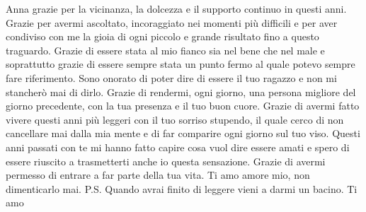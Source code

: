 \documentclass[12pt,a4paper,twoside]{report}
\begin{document}
Anna grazie per la vicinanza, la dolcezza e il supporto continuo in questi anni. 
\newline Grazie per avermi ascoltato, incoraggiato nei momenti più difficili e per aver condiviso con me la gioia di ogni piccolo e grande risultato fino a questo traguardo.
\newline Grazie di essere stata al mio fianco sia nel bene che nel male e soprattutto grazie di essere sempre stata un punto fermo al quale potevo sempre fare riferimento.
\newline Sono onorato di poter dire di essere il tuo ragazzo e non mi stancherò mai di dirlo.
\newline Grazie di rendermi, ogni giorno, una persona migliore del giorno precedente, con la tua presenza e il tuo buon cuore. 
\newline Grazie di avermi fatto vivere questi anni più leggeri con il tuo sorriso stupendo, il quale cerco di non cancellare mai dalla mia mente e di far comparire ogni giorno sul tuo viso.
\newline Questi anni passati con te mi hanno fatto capire cosa vuol dire essere amati e spero di essere riuscito a trasmetterti anche io questa sensazione.
\newline Grazie di avermi permesso di entrare a far parte della tua vita. 
\newline Ti amo amore mio, non dimenticarlo mai.
\newline P.S. Quando avrai finito di leggere vieni a darmi un bacino. 
\newline Ti amo
\end{document}
